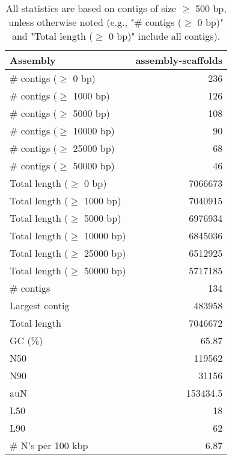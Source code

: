 \documentclass[12pt,a4paper]{article}
\begin{document}
\begin{table}[ht]
\begin{center}
\caption{All statistics are based on contigs of size $\geq$ 500 bp, unless otherwise noted (e.g., "\# contigs ($\geq$ 0 bp)" and "Total length ($\geq$ 0 bp)" include all contigs).}
\begin{tabular}{|l*{1}{|r}|}
\hline
Assembly & assembly-scaffolds \\ \hline
\# contigs ($\geq$ 0 bp) & 236 \\ \hline
\# contigs ($\geq$ 1000 bp) & 126 \\ \hline
\# contigs ($\geq$ 5000 bp) & 108 \\ \hline
\# contigs ($\geq$ 10000 bp) & 90 \\ \hline
\# contigs ($\geq$ 25000 bp) & 68 \\ \hline
\# contigs ($\geq$ 50000 bp) & 46 \\ \hline
Total length ($\geq$ 0 bp) & 7066673 \\ \hline
Total length ($\geq$ 1000 bp) & 7040915 \\ \hline
Total length ($\geq$ 5000 bp) & 6976934 \\ \hline
Total length ($\geq$ 10000 bp) & 6845036 \\ \hline
Total length ($\geq$ 25000 bp) & 6512925 \\ \hline
Total length ($\geq$ 50000 bp) & 5717185 \\ \hline
\# contigs & 134 \\ \hline
Largest contig & 483958 \\ \hline
Total length & 7046672 \\ \hline
GC (\%) & 65.87 \\ \hline
N50 & 119562 \\ \hline
N90 & 31156 \\ \hline
auN & 153434.5 \\ \hline
L50 & 18 \\ \hline
L90 & 62 \\ \hline
\# N's per 100 kbp & 6.87 \\ \hline
\end{tabular}
\end{center}
\end{table}
\end{document}
